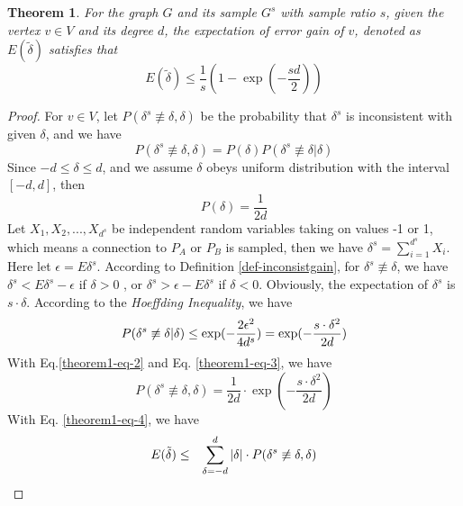 \documentclass{sig-alternate-2013}
\begin{document}
\newtheorem{theorem}{Theorem}
\begin{theorem}\label{theorem-partition-error-a-vertex}
For the graph $G$ and its sample $G^s$ with sample ratio $s$, given the vertex $v \in V$ and its degree $d$, the expectation of error gain of $v$, denoted as $E(\tilde\delta)$ satisfies that
\begin{equation}\label{theorem1-eq-0}
E(\tilde\delta) \leq \frac{1}{s} (1-\exp(-\frac{s d}{2}))
\end{equation}
\end{theorem}
\begin{proof}
For $v \in V$, let $P(\delta^s \not\equiv \delta, \delta)$ be the probability that $\delta^s$ is inconsistent with given $\delta$, and we have
\begin{equation}\label{theorem1-eq-1}
P( \delta^s \not\equiv \delta, \delta) = P(\delta)P(\delta^s \not\equiv \delta |\delta)
\end{equation}
Since $-d\leq\delta\leq d$, and we assume $\delta$ obeys uniform distribution with the interval $[-d, d]$, then
\begin{equation}\label{theorem1-eq-2}
P(\delta)=\frac{1}{2d}
\end{equation}
Let $X_1, X_2,...,X_{d^s}$ be independent random variables taking on values -1 or 1, which means a connection to $P_A$ or $P_B$ is sampled, then we have $\delta^s = \sum_{i=1}^{d^s} X_i$. Here let $\epsilon = E\delta^s$.
According to Definition \ref{def-inconsistgain}, for $ \delta^s \not\equiv \delta$, we have $\delta^s < E\delta^s - \epsilon$ if $\delta > 0 $ , or $\delta^s > \epsilon - E\delta^s$ if $\delta < 0$.
Obviously, the expectation of $\delta^s$ is $s\cdot \delta$. According to the \textit{Hoeffding Inequality}, we have
\begin{equation}\label{theorem1-eq-3}
P(\delta^s \not\equiv \delta | \delta)  \leq  \exp(-\frac{2\epsilon^2}{4d^s}) \\
 = \exp(-\frac{s\cdot \delta^2}{2d})
\end{equation}
With Eq.\eqref{theorem1-eq-2} and Eq. \eqref{theorem1-eq-3}, we have
\begin{equation}\label{theorem1-eq-4}
P( \delta^s \not\equiv \delta, \delta) = \frac{1}{2d} \cdot \exp(-\frac{s\cdot \delta^2}{2d})
\end{equation}
With Eq. \eqref{theorem1-eq-4}, we have
\begin{eqnarray}\label{theorem1-eq-5}
E(\tilde\delta) &\leq& \sum_{\delta=-d}^{d} {|\delta| \cdot P( \delta^s \not\equiv \delta, \delta) } \notag \\

\end{eqnarray}
\end{proof}
\end{document}
